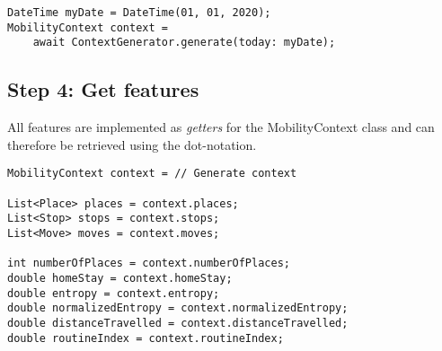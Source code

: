 \begin{verbatim}
DateTime myDate = DateTime(01, 01, 2020);
MobilityContext context = 
    await ContextGenerator.generate(today: myDate);
\end{verbatim}

\subsection*{Step 4: Get features}
All features are implemented as \textit{getters} for the MobilityContext class and can therefore be retrieved using the dot-notation. 

\begin{verbatim}
MobilityContext context = // Generate context

List<Place> places = context.places;
List<Stop> stops = context.stops;
List<Move> moves = context.moves;

int numberOfPlaces = context.numberOfPlaces;
double homeStay = context.homeStay;
double entropy = context.entropy;
double normalizedEntropy = context.normalizedEntropy;
double distanceTravelled = context.distanceTravelled;
double routineIndex = context.routineIndex;
\end{verbatim}